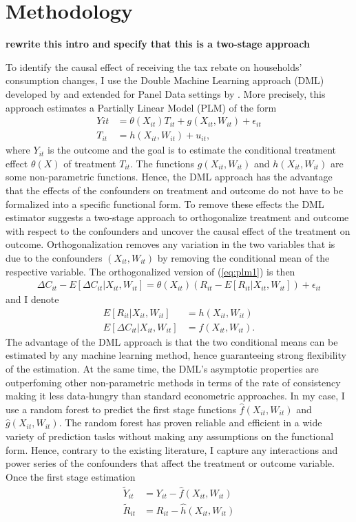 \section*{Methodology}
\textbf{rewrite this intro and specify that this is a two-stage approach}

To identify the causal effect of receiving the tax rebate on households' consumption changes, I use the Double Machine Learning approach (DML) developed by \cite{DML2017} and extended for Panel Data settings by \cite{PanelDML}. More precisely, this approach estimates a Partially Linear Model (PLM) of the form
\begin{align}
    Y{it}&=\theta(X_{it})T_{it}+g(X_{it}, W_{it})+\epsilon_{it} \label{eq:plm1}\\
    T_{it}&=h(X_{it}, W_{it})+u_{it}, \label{eq:plm2}
\end{align}
where $Y_{it}$ is the outcome and the goal is to estimate the conditional treatment effect $\theta(X)$ of treatment $T_{it}$. The functions $g(X_{it}, W_{it})$ and $h(X_{it}, W_{it})$ are some non-parametric functions. Hence, the DML approach has the advantage that the effects of the confounders on treatment and outcome do not have to be formalized into a specific functional form. To remove these effects the DML estimator suggests a two-stage approach to orthogonalize treatment and outcome with respect to the confounders and uncover the causal effect of the treatment on outcome. Orthogonalization removes any variation in the two variables that is due to the confounders $(X_{it}, W_{it})$ by removing the conditional mean of the respective variable. The orthogonalized version of (\ref{eq:plm1}) is then
\begin{align}
    \Delta C_{it}-E[\Delta C_{it}|X_{it}, W_{it}]=\theta(X_{it})(R_{it}-E[R_{it}|X_{it}, W_{it}])+\epsilon_{it}
\end{align}
and I denote
\begin{align}
    E[R_{it}|X_{it}, W_{it}]&=h(X_{it}, W_{it}) \\
    E[\Delta C_{it}|X_{it}, W_{it}]&=f(X_{it}, W_{it}).
\end{align}
The advantage of the DML approach is that the two conditional means can be estimated by any machine learning method, hence guaranteeing strong flexibility of the estimation. At the same time, the DML's asymptotic properties are outperfoming other non-parametric methods in terms of the rate of consistency making it less data-hungry than standard econometric approaches. In my case, I use a random forest to predict the first stage functions $\hat{f}(X_{it}, W_{it})$ and $\hat{g}(X_{it}, W_{it})$. The random forest has proven reliable and efficient in a wide variety of prediction tasks without making any assumptions on the functional form. Hence, contrary to the existing literature, I capture any interactions and power series of the confounders that affect the treatment or outcome variable. \\ 
Once the first stage estimation 
\begin{align}
    \tilde{Y}_{it}&=Y_{it}-\hat{f}(X_{it}, W_{it})\\
    \tilde{R}_{it}&=R_{it}-\hat{h}(X_{it}, W_{it})
\end{align}

